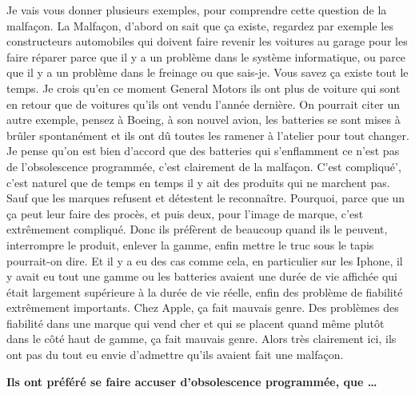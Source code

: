 \begin{small}
Je vais vous donner plusieurs exemples, pour comprendre cette question de la malfaçon. La Malfaçon, d'abord on sait que ça existe, regardez par exemple les constructeurs automobiles qui doivent faire revenir les voitures au garage pour les faire réparer parce que il y a un problème dans le système informatique, ou parce que il y a un problème dans le freinage ou que sais-je. Vous savez ça existe tout le temps. Je crois qu'en ce moment General Motors ils ont plus de voiture qui sont en retour que de voitures qu'ils ont vendu l'année dernière. 
On pourrait citer un autre exemple, pensez à Boeing, à son nouvel avion, les batteries se sont mises à brûler spontanément et ils ont dû toutes les ramener à l'atelier pour tout changer. Je pense qu'on est bien d'accord que des batteries qui s'enflamment ce n'est pas de l'obsolescence programmée, c'est clairement de la malfaçon. C'est compliqué', c'est naturel que de temps en temps il y ait des produits qui ne marchent pas. Sauf que les marques refusent et détestent le reconnaître. Pourquoi, parce que un ça peut leur faire des procès, et puis deux, pour l'image de marque, c'est extrêmement compliqué. Donc ils préfèrent de beaucoup quand ils le peuvent, interrompre le produit, enlever la gamme, enfin mettre le truc sous le tapis pourrait-on dire. 
Et il y a eu des cas comme cela, en particulier sur les Iphone, il y avait eu tout une gamme ou les batteries avaient une durée de vie affichée qui était largement supérieure à la durée de vie réelle, enfin des problème de fiabilité extrêmement importants. Chez Apple, ça fait mauvais genre. Des problèmes des fiabilité dans une marque qui vend cher et qui se placent quand même plutôt dans le côté haut de gamme, ça fait mauvais genre. Alors très clairement ici, ils ont pas du tout eu envie d'admettre qu'ils avaient fait une malfaçon.

\textbf{Ils ont préféré se faire accuser d'obsolescence programmée, que \dots}
\smallbreak



\end{small}
